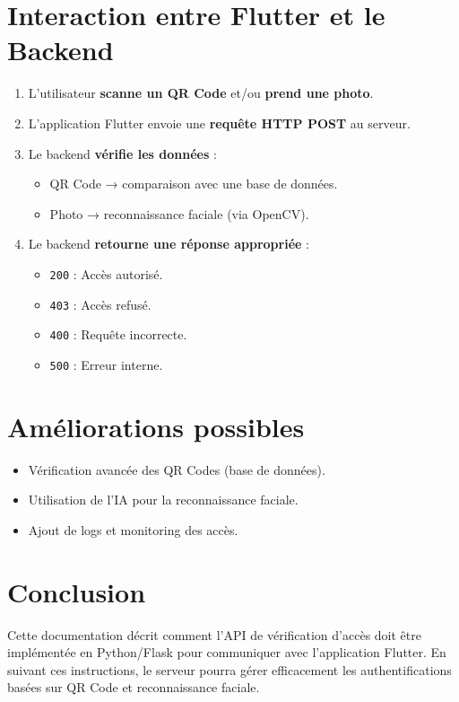 \documentclass[a4paper,12pt]{article}
\begin{document}
\section{Interaction entre Flutter et le Backend}

\begin{enumerate}
    \item L'utilisateur \textbf{scanne un QR Code} et/ou \textbf{prend une photo}.
    \item L'application Flutter envoie une \textbf{requête HTTP POST} au serveur.
    \item Le backend \textbf{vérifie les données} :
    \begin{itemize}
        \item QR Code → comparaison avec une base de données.
        \item Photo → reconnaissance faciale (via OpenCV).
    \end{itemize}
    \item Le backend \textbf{retourne une réponse appropriée} :
    \begin{itemize}
        \item \texttt{200} : Accès autorisé.
        \item \texttt{403} : Accès refusé.
        \item \texttt{400} : Requête incorrecte.
        \item \texttt{500} : Erreur interne.
    \end{itemize}
\end{enumerate}

\section{Améliorations possibles}
\begin{itemize}
    \item Vérification avancée des QR Codes (base de données).
    \item Utilisation de l'IA pour la reconnaissance faciale.
    \item Ajout de logs et monitoring des accès.
\end{itemize}

\section{Conclusion}
Cette documentation décrit comment l'API de vérification d'accès doit être implémentée en Python/Flask pour communiquer avec l'application Flutter. En suivant ces instructions, le serveur pourra gérer efficacement les authentifications basées sur QR Code et reconnaissance faciale.
\end{document}

